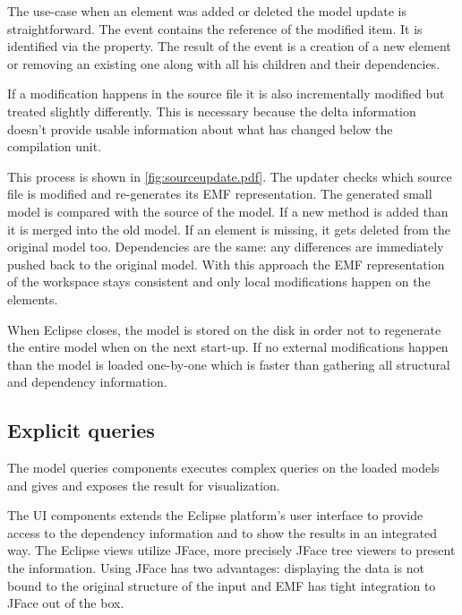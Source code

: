The use-case when an element was added or deleted the model update is
straightforward. The event contains the reference of the modified item. It is
identified via the  property. The result of the event is a
creation of a new element or removing an existing one along with all his
children and their dependencies.

If a modification happens in the source file it is also incrementally modified
but treated slightly differently. This is necessary because the delta
information doesn't provide usable information about what has changed below the
compilation unit.


This process is shown in \autoref{fig:sourceupdate.pdf}. The updater checks
which source file is modified and re-generates its EMF representation. The
generated small model is compared with the source of the model. If a new method
is added than it is merged into the old model. If an element is missing, it gets
deleted from the original model too. Dependencies are the same: any differences
are immediately pushed back to the original model. With this approach the EMF
representation of the workspace stays consistent and only local modifications
happen on the elements.

When Eclipse closes, the model is stored on the disk in order not to regenerate
the entire model when on the next start-up. If no external modifications happen
than the model is loaded one-by-one which is faster than gathering all
structural and dependency information.

\subsection{Explicit queries}
The model queries components executes complex queries on the loaded models and
gives and exposes the result for  visualization. 



The UI components extends the Eclipse platform's user interface to provide
access to the dependency information and to show the results in an integrated
way. The Eclipse views utilize JFace, more precisely JFace tree viewers to present
the information. Using JFace has two advantages: displaying the data is not
bound to the original structure of the input and EMF has tight integration to
JFace out of the box.

